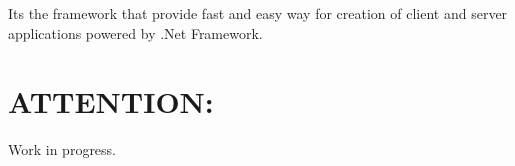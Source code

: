 It\textquotesingle{}s the framework that provide fast and easy way for creation of client and server applications powered by .Net Framework.

\section*{A\+T\+T\+E\+N\+T\+I\+ON\+:}

Work in progress. 